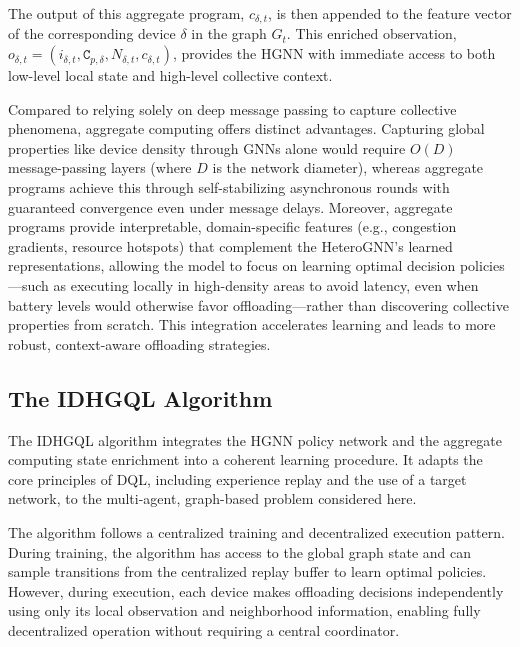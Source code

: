 The output of this aggregate program, 
 $c_{\delta,t}$, is then appended to the feature vector of the corresponding device $\delta$ 
 in the graph $G_t$. 
% 
This enriched observation, 
 $o_{\delta,t} = (i_{\delta,t}, \mathtt{C}_{p, \delta}, N_{\delta,t}, c_{\delta,t})$, 
 provides the \gls{HGNN} with immediate access to both low-level local state and high-level collective context. 


Compared to relying solely on deep message passing to capture collective phenomena,
 aggregate computing offers distinct advantages.
%
Capturing global properties like device density through GNNs alone would require 
 $O(D)$ message-passing layers (where $D$ is the network diameter),
 whereas aggregate programs achieve this through self-stabilizing asynchronous rounds with 
 guaranteed convergence even under message delays.
%
Moreover, aggregate programs provide interpretable, domain-specific features 
 (e.g., congestion gradients, resource hotspots) that complement the HeteroGNN's learned representations,
 allowing the model to focus on learning optimal decision policies---such as executing locally 
 in high-density areas to avoid latency, even when battery levels would otherwise favor offloading---rather than 
 discovering collective properties from scratch.
%
This integration accelerates learning and leads to more robust, context-aware offloading strategies.


\subsection{The IDHGQL Algorithm}
The IDHGQL algorithm integrates the \gls{HGNN} policy network and the aggregate computing state enrichment into a coherent learning procedure. 
 It adapts the core principles of \gls{DQL}, 
 including experience replay and the use of a target network, 
 to the multi-agent, graph-based problem considered here.

The algorithm follows a centralized training and decentralized execution pattern.
During training, the algorithm has access to the global graph state and can sample transitions from the centralized replay buffer to learn optimal policies.
However, during execution, each device makes offloading decisions independently using only its local observation and neighborhood information,
enabling fully decentralized operation without requiring a central coordinator.

